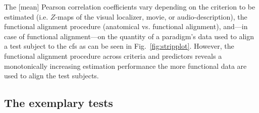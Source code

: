 %
The [mean] Pearson correlation coefficients vary depending on the criterion to
be estimated (i.e. $Z$-maps of the visual localizer, movie, or
audio-description), the functional alignment procedure (anatomical vs.
functional alignment), and---in case of functional alignment---on the quantity
of a paradigm's data used to align a test subject to the \ac{cfs} as can be seen
in Fig.~\ref{fig:stripplot}.
%
However, the functional alignment procedure across criteria and predictors
reveals a monotonically increasing estimation performance the more functional
data are used to align the test subjects.


\subsection{The exemplary tests}







